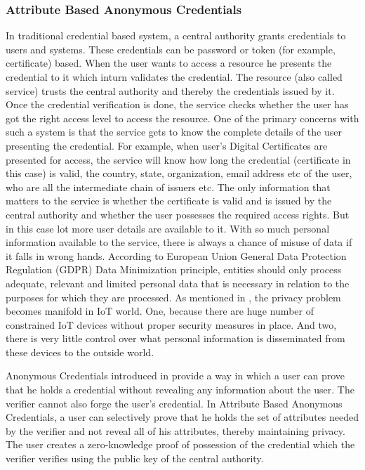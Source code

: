 \documentclass[journal]{IEEEtran}
\begin{document}
\subsubsection{Attribute Based Anonymous Credentials}
In traditional credential based system, a central authority grants credentials to users and systems. These credentials can be password or token (for example, certificate) based. When the user wants to access a resource he presents the credential to it which inturn validates the credential. The resource (also called service) trusts the central authority and thereby the credentials issued by it. Once the credential verification is done, the service checks whether the user has got the right access level to access the resource. One of the primary concerns with such a system is that the service gets to know the complete details of the user presenting the credential. For example, when user's Digital Certificates are presented for access, the service will know how long the credential (certificate in this case) is valid, the country, state, organization, email address etc of the user, who are all the intermediate chain of issuers etc. The only information that matters to the service is whether the certificate is valid and is issued by the central authority and whether the user possesses the required access rights. But in this case lot more user details are available to it. With so much personal information available to the service, there is always a chance of misuse of data if it falls in wrong hands. According to European Union General Data Protection Regulation (GDPR) Data Minimization principle, entities should only process adequate, relevant and limited personal data that is necessary in relation to the purposes for which they are processed. As mentioned in \cite{Ziegeldorf2014PrivacyIT}, the privacy problem becomes manifold in IoT world. One, because there are huge number of constrained IoT devices without proper security measures in place. And two, there is very little control over what personal information is disseminated from these devices to the outside world.

Anonymous Credentials introduced in \cite{chaum83blindsign} provide a way in which a user can prove that he holds a credential without revealing any information about the user. The verifier cannot also forge the user's credential. In Attribute Based Anonymous Credentials, a user can selectively prove that he holds the set of attributes needed by the verifier and not reveal all of his attributes, thereby maintaining privacy. The user creates a zero-knowledge proof of possession of the credential which the verifier verifies using the public key of the central authority. 
\end{document}
